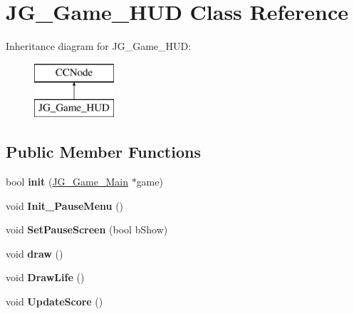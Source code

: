 \hypertarget{class_j_g___game___h_u_d}{\section{J\-G\-\_\-\-Game\-\_\-\-H\-U\-D Class Reference}
\label{class_j_g___game___h_u_d}
}
Inheritance diagram for J\-G\-\_\-\-Game\-\_\-\-H\-U\-D\-:\begin{figure}[H]
\begin{center}
\leavevmode
\includegraphics[height=2.000000cm]{class_j_g___game___h_u_d}
\end{center}
\end{figure}
\subsection*{Public Member Functions}
\begin{DoxyCompactItemize}
\item 
\hypertarget{class_j_g___game___h_u_d_aef2a88064a176f3d621da7a51f3a534d}{bool {\bfseries init} (\hyperlink{class_j_g___game___main}{J\-G\-\_\-\-Game\-\_\-\-Main} $\ast$game)}\label{class_j_g___game___h_u_d_aef2a88064a176f3d621da7a51f3a534d}

\item 
\hypertarget{class_j_g___game___h_u_d_a9d7347316f245e90d914e60da1138e14}{void {\bfseries Init\-\_\-\-Pause\-Menu} ()}\label{class_j_g___game___h_u_d_a9d7347316f245e90d914e60da1138e14}

\item 
\hypertarget{class_j_g___game___h_u_d_aafd38bbdaf7e8e2b5111be32b932adca}{void {\bfseries Set\-Pause\-Screen} (bool b\-Show)}\label{class_j_g___game___h_u_d_aafd38bbdaf7e8e2b5111be32b932adca}

\item 
\hypertarget{class_j_g___game___h_u_d_af65407785d15c72c92fb4cf4df54cae3}{void {\bfseries draw} ()}\label{class_j_g___game___h_u_d_af65407785d15c72c92fb4cf4df54cae3}

\item 
\hypertarget{class_j_g___game___h_u_d_ae1d35126fa37a9647365bdb96402a388}{void {\bfseries Draw\-Life} ()}\label{class_j_g___game___h_u_d_ae1d35126fa37a9647365bdb96402a388}

\item 
\hypertarget{class_j_g___game___h_u_d_ad7b8a1d0920dc3abb928eb6705c03efe}{void {\bfseries Update\-Score} ()}\label{class_j_g___game___h_u_d_ad7b8a1d0920dc3abb928eb6705c03efe}

\end{DoxyCompactItemize}
